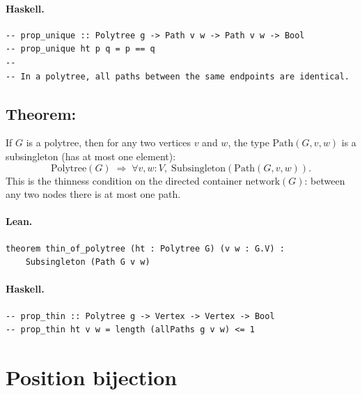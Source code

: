 \documentclass[11pt,a4paper]{article}
\begin{document}
\paragraph{Haskell.}
\begin{lstlisting}[style=haskell]
-- prop_unique :: Polytree g -> Path v w -> Path v w -> Bool
-- prop_unique ht p q = p == q
--
-- In a polytree, all paths between the same endpoints are identical.
\end{lstlisting}


\subsection{Theorem: }

\begin{thm}
If $G$ is a polytree, then for any two vertices $v$ and $w$, the type
$\mathrm{Path}(G, v, w)$ is a subsingleton (has at most one element):
\[
  \mathrm{Polytree}(G) \;\Rightarrow\;
  \forall v, w : V,\; \mathrm{Subsingleton}(\mathrm{Path}(G, v, w)).
\]
This is the thinness condition on the directed container $\mathrm{network}(G)$:
between any two nodes there is at most one path.
\end{thm}

\paragraph{Lean.}
\begin{lstlisting}[style=lean]
theorem thin_of_polytree (ht : Polytree G) (v w : G.V) :
    Subsingleton (Path G v w)
\end{lstlisting}

\paragraph{Haskell.}
\begin{lstlisting}[style=haskell]
-- prop_thin :: Polytree g -> Vertex -> Vertex -> Bool
-- prop_thin ht v w = length (allPaths g v w) <= 1
\end{lstlisting}


\section{Position bijection}
\end{document}
